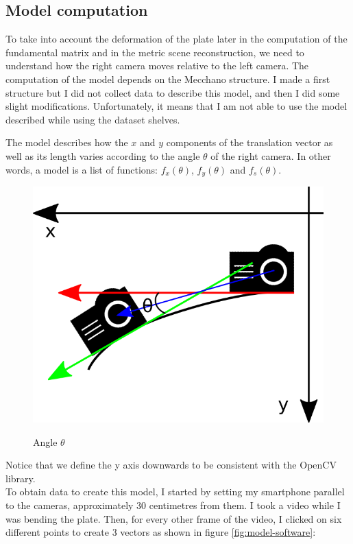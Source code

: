 \documentclass[11pt]{report}
\begin{document}
\subsection{Model computation}

To take into account the deformation of the plate later in the computation of the fundamental matrix and in the metric scene reconstruction, we need to understand how the right camera moves relative to the left camera. The computation of the model depends on the Mecchano structure. I made a first structure but I did not collect data to describe this model, and then I did some slight modifications. Unfortunately, it means that I am not able to use the model described while using the dataset shelves.


The model describes how the $x$ and $y$ components of the translation vector as well as its length varies according to the angle $\theta$ of the right camera. In other words, a model is a list of functions: $f_x(\theta)$, $f_y(\theta)$ and $f_s(\theta)$.

\begin{figure}[H]
    \begin{center}
        \includegraphics[scale=0.4]{images/modeltheta.png} 
        \label{fig:theta}
        \caption{Angle $\theta$}
    \end{center}
\end{figure}

Notice that we define the y axis downwards to be consistent with the OpenCV library.
\\
To obtain data to create this model, I started by setting my smartphone parallel to the cameras, approximately 30 centimetres from them. I took a video while I was bending the plate. Then, for every other frame of the video, I clicked on six different points to create 3 vectors as shown in figure \ref{fig:model-software}:
\end{document}
